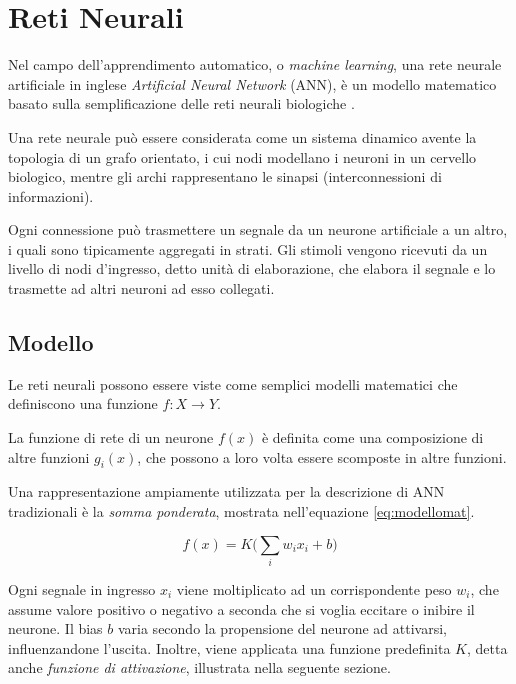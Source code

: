 \chapter{Reti Neurali}
\label{chap:RetiNeurali}

Nel campo dell'apprendimento automatico, o \emph{machine learning}, una rete neurale artificiale  in inglese \emph{Artificial Neural Network} (ANN),  è un modello matematico basato sulla semplificazione delle reti neurali biologiche \cite{samuel1959some}.

Una rete neurale può essere considerata come un sistema dinamico avente la topologia di un grafo orientato, i cui nodi modellano i neuroni in un cervello biologico, mentre gli archi rappresentano le sinapsi (interconnessioni di informazioni).

Ogni connessione può trasmettere un segnale da un neurone artificiale a un altro, i quali sono tipicamente aggregati in strati. Gli stimoli vengono ricevuti da un livello di nodi d'ingresso, detto unità di elaborazione, che elabora il segnale e lo trasmette ad altri neuroni ad esso collegati.

\section{Modello}
\label{sec:modello}

Le reti neurali possono essere viste come semplici modelli matematici che definiscono una funzione $f:X\rightarrow Y$. 

La funzione di rete di un neurone $f(x)$ è definita come una composizione di altre funzioni $g_i(x)$, che possono a loro volta essere scomposte in altre funzioni.

Una rappresentazione ampiamente utilizzata per la descrizione di ANN tradizionali è la \emph{somma ponderata}, mostrata nell'equazione \ref{eq:modellomat}.

\begin{equation}
f(x)=K \bigg( \sum_{i}w_ix_i +b\bigg)
\label{eq:modellomat}
\end{equation}

Ogni segnale in ingresso $x_i$ viene moltiplicato ad un corrispondente peso $w_i$, che assume valore positivo o negativo a seconda che si voglia eccitare o inibire il neurone.  
Il bias $b$ varia secondo la propensione del neurone ad attivarsi, influenzandone l'uscita.
Inoltre, viene applicata una funzione predefinita $K$, detta anche \emph{funzione di attivazione}, illustrata nella seguente sezione.

